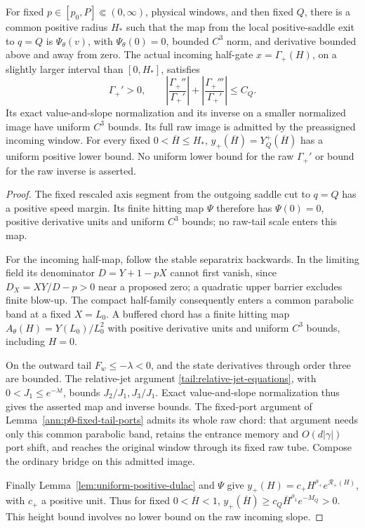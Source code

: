 \begin{lemma}
\label{ann:p0-positive-interface}
For fixed \(p\in[p_0,P]\Subset(0,\infty)\), physical windows,
and then fixed \(Q\), there is a common positive radius \(H_*\)
such that the map from the local positive-saddle exit to \(q=Q\)
is \(\Psi_\theta(v)\), with \(\Psi_\theta(0)=0\), bounded
\(C^3\) norm, and derivative bounded above and away from zero.
The actual incoming half-gate \(x=\Gamma_+(H)\), on a slightly
larger interval than \([0,H_*]\), satisfies
\[
 \Gamma_+'>0,\qquad
 \left|\frac{\Gamma_+''}{\Gamma_+'}\right|
 +\left|\frac{\Gamma_+'''}{\Gamma_+'}\right|\le C_Q.
\]
Its exact value-and-slope normalization and its inverse on a smaller
normalized image have uniform \(C^3\) bounds. Its full raw image
is admitted by the preassigned incoming window.
For every fixed \(0<\overline H\le H_*\),
\(y_+(\overline H)=Y_Q^+(\overline H)\) has a uniform positive
lower bound. No uniform lower bound for the raw \(\Gamma_+'\)
or bound for the raw inverse is asserted.
\end{lemma}
\begin{proof}
The fixed rescaled axis segment from the outgoing saddle cut to \(q=Q\)
has a positive speed margin. Its finite hitting map \(\Psi\) therefore
has \(\Psi(0)=0\), positive derivative units and uniform \(C^3\)
bounds; no raw-tail scale enters this map.

For the incoming half-map, follow the stable separatrix backwards. In
the limiting field its denominator \(D=Y+1-pX\) cannot first vanish,
since \(D_X=XY/D-p>0\) near a proposed zero; a quadratic upper
barrier excludes finite blow-up. The compact half-family consequently
enters a common parabolic band at a fixed \(X=L_0\). A buffered chord
has a finite hitting map \(A_\theta(H)=Y(L_0)/L_0^2\) with positive
derivative units and uniform \(C^3\) bounds, including \(H=0\).

On the outward tail \(F_w\le-\lambda<0\), and the state derivatives
through order three are bounded. The relative-jet argument
\eqref{tail:relative-jet-equations}, with
\(0<J_1\le e^{-\lambda t}\), bounds \(J_2/J_1,J_3/J_1\).
Exact value-and-slope normalization thus gives the asserted map and
inverse bounds. The fixed-port argument of
Lemma~\ref{ann:p0-fixed-tail-ports} admits its whole raw chord: that
argument needs only this common parabolic band, retains the entrance
memory and \(O(d|\gamma|)\) port shift, and reaches the original
window through its fixed raw tube. Compose the ordinary bridge on this
admitted image.

Finally Lemma~\ref{lem:uniform-positive-dulac} and \(\Psi\) give
\(y_+(H)=c_+H^{\rho_+}e^{\mathcal R_+(H)}\), with \(c_+\) a
positive unit. Thus for fixed \(0<\overline H<1\),
\(y_+(\overline H)\ge c_Q\overline H^{\rho_1}e^{-M_Q}>0\).
This height bound involves no lower bound on the raw incoming slope.
\end{proof}

